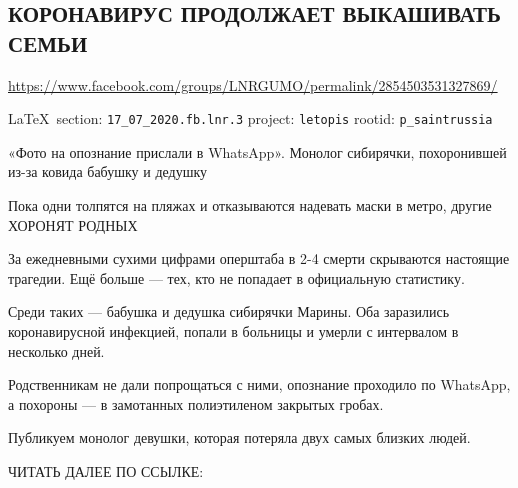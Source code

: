  
 

\subsection{КОРОНАВИРУС ПРОДОЛЖАЕТ ВЫКАШИВАТЬ СЕМЬИ}
\label{sec:17_07_2020.fb.lnr.3}
\url{https://www.facebook.com/groups/LNRGUMO/permalink/2854503531327869/}
  
\vspace{0.5cm}
{\ifDEBUG\small\LaTeX~section: \verb|17_07_2020.fb.lnr.3| project: \verb|letopis| rootid: \verb|p_saintrussia|\fi}
\vspace{0.5cm}

«Фото на опознание прислали в WhatsApp».  Монолог сибирячки, похоронившей из-за
ковида бабушку и дедушку

Пока одни толпятся на пляжах и отказываются надевать маски в метро, другие
ХОРОНЯТ РОДНЫХ

За ежедневными сухими цифрами оперштаба в 2-4 смерти скрываются настоящие
трагедии.  Ещё больше — тех, кто не попадает в официальную статистику.

Среди таких — бабушка и дедушка сибирячки Марины.  Оба заразились
коронавирусной инфекцией, попали в больницы и умерли с интервалом в несколько
дней.

Родственникам не дали попрощаться с ними, опознание проходило по WhatsApp, а
похороны — в замотанных полиэтиленом закрытых гробах.

Публикуем монолог девушки, которая потеряла двух самых близких людей.

ЧИТАТЬ ДАЛЕЕ ПО ССЫЛКЕ: 
